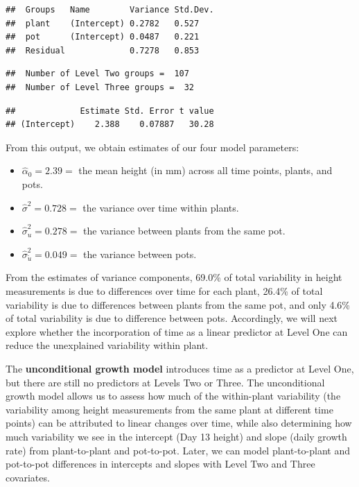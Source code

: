 \documentclass[
]{krantz}
\providecommand{\tightlist}{%
  \setlength{\itemsep}{0pt}\setlength{\parskip}{0pt}}
\begin{document}
\begin{verbatim}
##  Groups   Name        Variance Std.Dev.
##  plant    (Intercept) 0.2782   0.527   
##  pot      (Intercept) 0.0487   0.221   
##  Residual             0.7278   0.853
\end{verbatim}

\begin{verbatim}
##  Number of Level Two groups =  107 
##  Number of Level Three groups =  32
\end{verbatim}

\begin{verbatim}
##             Estimate Std. Error t value
## (Intercept)    2.388    0.07887   30.28
\end{verbatim}

From this output, we obtain estimates of our four model parameters:

\begin{itemize}
\tightlist
\item
  \(\hat{\alpha}_{0}=2.39=\) the mean height (in mm) across all time points, plants, and pots.
\item
  \(\hat{\sigma}^2=0.728=\) the variance over time within plants.
\item
  \(\hat{\sigma}_{u}^{2}=0.278=\) the variance between plants from the same pot.
\item
  \(\hat{\sigma}_{\tilde{u}}^{2}=0.049=\) the variance between pots.
\end{itemize}

From the estimates of variance components, 69.0\% of total variability in height measurements is due to differences over time for each plant, 26.4\% of total variability is due to differences between plants from the same pot, and only 4.6\% of total variability is due to difference between pots. Accordingly, we will next explore whether the incorporation of time as a linear predictor at Level One can reduce the unexplained variability within plant.

The \textbf{unconditional growth model}  introduces time as a predictor at Level One, but there are still no predictors at Levels Two or Three. The unconditional growth model allows us to assess how much of the within-plant variability (the variability among height measurements from the same plant at different time points) can be attributed to linear changes over time, while also determining how much variability we see in the intercept (Day 13 height) and slope (daily growth rate) from plant-to-plant and pot-to-pot. Later, we can model plant-to-plant and pot-to-pot differences in intercepts and slopes with Level Two and Three covariates.
\end{document}
